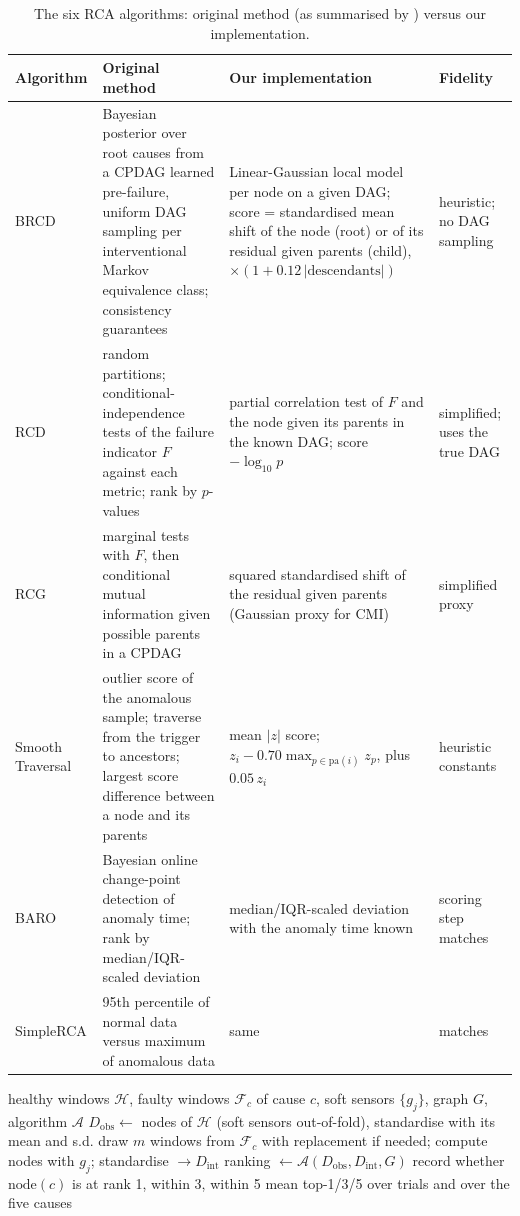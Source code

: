 \documentclass[11pt]{article}
\begin{document}
\begin{table}[t]\centering\footnotesize
\caption{The six RCA algorithms: original method (as summarised by \citealt{lee2026brcd}) versus our implementation.}\label{tab:algs}
\begin{tabular}{p{1.8cm}p{4.4cm}p{5.2cm}p{2.1cm}}\toprule
Algorithm & Original method & Our implementation & Fidelity\\\midrule
BRCD \citep{lee2026brcd} & Bayesian posterior over root causes from a CPDAG learned pre-failure, uniform DAG sampling per interventional Markov equivalence class; consistency guarantees & Linear-Gaussian local model per node on a given DAG; score = standardised mean shift of the node (root) or of its residual given parents (child), $\times(1+0.12\,|\text{descendants}|)$ & heuristic; no DAG sampling\\
RCD \citep{ikram2022rcd} & random partitions; conditional-independence tests of the failure indicator $F$ against each metric; rank by $p$-values & partial correlation test of $F$ and the node given its parents in the known DAG; score $-\log_{10}p$ & simplified; uses the true DAG\\
RCG \citep{ikram2025rcg} & marginal tests with $F$, then conditional mutual information given possible parents in a CPDAG & squared standardised shift of the residual given parents (Gaussian proxy for CMI) & simplified proxy\\
Smooth Traversal \citep{orchard2025} & outlier score of the anomalous sample; traverse from the trigger to ancestors; largest score difference between a node and its parents & mean $|z|$ score; $z_i-0.70\max_{p\in\text{pa}(i)}z_p$, plus $0.05\,z_i$ & heuristic constants\\
BARO \citep{pham2024baro} & Bayesian online change-point detection of anomaly time; rank by median/IQR-scaled deviation & median/IQR-scaled deviation with the anomaly time known & scoring step matches\\
SimpleRCA \citep{fang2025simplerca} & 95th percentile of normal data versus maximum of anomalous data & same & matches\\\bottomrule
\end{tabular}
\end{table}

\begin{algorithm}[t]
\caption{Benchmark loop for one fault, condition and number of samples $m$.}\label{alg:bench}
\begin{algorithmic}[1]
\REQUIRE healthy windows $\mathcal H$, faulty windows $\mathcal F_c$ of cause $c$, soft sensors $\{g_j\}$, graph $G$, algorithm $\mathcal A$
\STATE $D_\text{obs}\leftarrow$ nodes of $\mathcal H$ (soft sensors out-of-fold), standardise with its mean and s.d.
\STATE draw $m$ windows from $\mathcal F_c$ with replacement if needed; compute nodes with $g_j$; standardise $\to D_\text{int}$
\STATE ranking $\leftarrow\mathcal A(D_\text{obs},D_\text{int},G)$
\STATE record whether $\text{node}(c)$ is at rank 1, within 3, within 5
\ENDFOR
\RETURN mean top-1/3/5 over trials and over the five causes
\end{algorithmic}
\end{algorithm}
\end{document}
